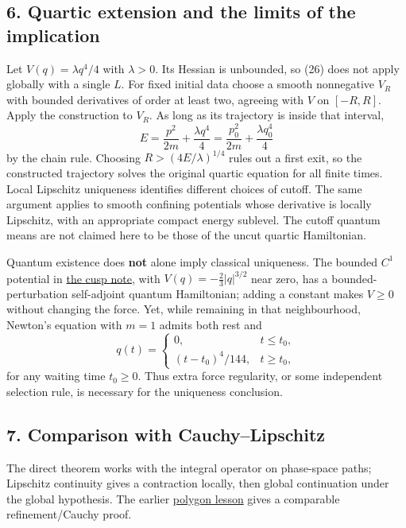 \documentclass[11pt,a4paper]{article}
\begin{document}
\hypertarget{quartic-extension-and-the-limits-of-the-implication}{%
\subsection{6. Quartic extension and the limits of the
implication}\label{quartic-extension-and-the-limits-of-the-implication}}

Let \(V(q)=\lambda q^4/4\) with \(\lambda>0\). Its Hessian is unbounded,
so (26) does not apply globally with a single \(L\). For fixed initial
data choose a smooth nonnegative \(V_R\) with bounded derivatives of
order at least two, agreeing with \(V\) on \([-R,R]\). Apply the
construction to \(V_R\). As long as its trajectory is inside that
interval, \[E=\frac{p^2}{2m}+\frac{\lambda q^4}{4}
 =\frac{p_0^2}{2m}+\frac{\lambda q_0^4}{4}\tag{28}\] by the chain rule.
Choosing \(R>(4E/\lambda)^{1/4}\) rules out a first exit, so the
constructed trajectory solves the original quartic equation for all
finite times. Local Lipschitz uniqueness identifies different choices of
cutoff. The same argument applies to smooth confining potentials whose
derivative is locally Lipschitz, with an appropriate compact energy
sublevel. The cutoff quantum means are not claimed here to be those of
the uncut quartic Hamiltonian.

Quantum existence does \textbf{not} alone imply classical uniqueness.
The bounded \(C^1\) potential in
\href{newton-cusp-preparation-floor.md}{the cusp note}, with
\(V(q)=-\frac23|q|^{3/2}\) near zero, has a bounded-perturbation
self-adjoint quantum Hamiltonian; adding a constant makes \(V\ge0\)
without changing the force. Yet, while remaining in that neighbourhood,
Newton's equation with \(m=1\) admits both rest and \[q(t)=\begin{cases}
0,&t\le t_0,\\
(t-t_0)^4/144,&t\ge t_0,
\end{cases}\tag{29}\] for any waiting time \(t_0\ge0\). Thus extra force
regularity, or some independent selection rule, is necessary for the
uniqueness conclusion.

\hypertarget{comparison-with-cauchylipschitz}{%
\subsection{7. Comparison with
Cauchy--Lipschitz}\label{comparison-with-cauchylipschitz}}

The direct theorem works with the integral operator on phase-space
paths; Lipschitz continuity gives a contraction locally, then global
continuation under the global hypothesis. The earlier
\href{balaban-ode-lesson.md}{polygon lesson} gives a comparable
refinement/Cauchy proof.
\end{document}
